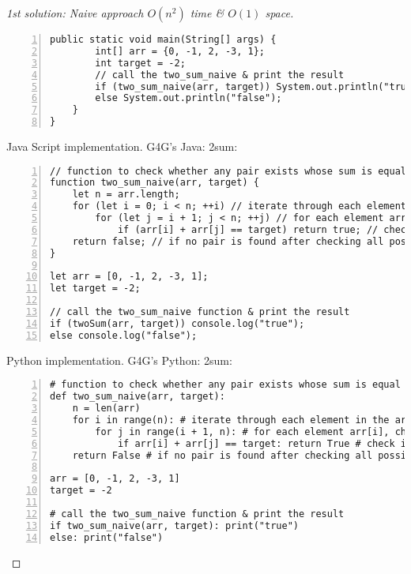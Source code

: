 \documentclass{article}
\begin{document}
\begin{proof}[1st solution: Naive approach $O(n^2)$ time \& $O(1)$ space]
\begin{Verbatim}[numbers=left,xleftmargin=5mm]
    public static void main(String[] args) {
        int[] arr = {0, -1, 2, -3, 1};
        int target = -2;
        // call the two_sum_naive & print the result
        if (two_sum_naive(arr, target)) System.out.println("true");
        else System.out.println("false");
    }
}
    \end{Verbatim}
    \item {\sf Java Script implementation.} G4G's Java: 2sum:
    \begin{Verbatim}[numbers=left,xleftmargin=5mm]
// function to check whether any pair exists whose sum is equal to the given target value
function two_sum_naive(arr, target) {
    let n = arr.length;
    for (let i = 0; i < n; ++i) // iterate through each element in the array
        for (let j = i + 1; j < n; ++j) // for each element arr[i], check every other element arr[j] that comes after it
            if (arr[i] + arr[j] == target) return true; // check if the sum of the current pair equals the target
    return false; // if no pair is found after checking all possibilities
}

let arr = [0, -1, 2, -3, 1];
let target = -2;

// call the two_sum_naive function & print the result
if (twoSum(arr, target)) console.log("true");
else console.log("false");
    \end{Verbatim}
    \item {\sf Python implementation.} G4G's Python: 2sum:
    \begin{Verbatim}[numbers=left,xleftmargin=5mm]
# function to check whether any pair exists whose sum is equal to the given target value
def two_sum_naive(arr, target):
    n = len(arr)
    for i in range(n): # iterate through each element in the array
        for j in range(i + 1, n): # for each element arr[i], check every other element arr[j] that comes after it
            if arr[i] + arr[j] == target: return True # check if the sum of the current pair equals the target
    return False # if no pair is found after checking all possibilities

arr = [0, -1, 2, -3, 1]
target = -2

# call the two_sum_naive function & print the result
if two_sum_naive(arr, target): print("true")
else: print("false")
    \end{Verbatim}
\end{proof}
\end{document}

